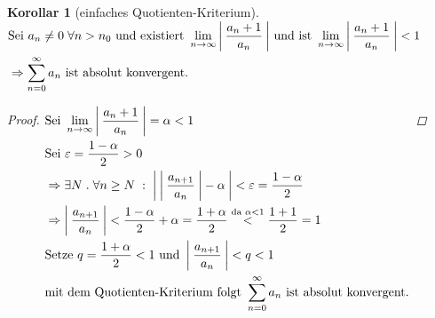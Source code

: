 \documentclass[a4paper,titlepage,oneside]{article}
\renewcommand{\epsilon}{\ensuremath{\varepsilon} }
\def\fa{\ensuremath{\forall}}
\def\sp{\hspace{0,1cm}}
\def\spdot{\sp.\sp}
\def\spcolon{\sp:\sp}
\newcommand{\suminf}[2][n]{\ensuremath{\sum_{#1= 0}^{\infty}{#2}}}
\renewcommand{\liminf}[2][n]{\ensuremath{\lim\limits_{#1 \rightarrow \infty}{#2}}}
\newcommand{\abs}[1]{\ensuremath{\left|\:#1\:\right|}}
\theoremstyle{thmstyle}
\newtheorem{korr}[satz]{Korollar}
\theoremstyle{subthmstyle}
\begin{document}
\begin{korr}[einfaches Quotienten-Kriterium]
\begin{math}\displaystyle \begin{aligned}[t]
&\text{Sei } a_n \ne 0 \sp \fa n > n_0 \text{ und existiert } \liminf{\abs{\frac{a_n+1}{a_n}}} \text{ und ist } \liminf{\abs{\frac{a_n+1}{a_n}}} < 1 \\
&\Rightarrow \suminf{a_n} \text{ ist absolut konvergent.}
\end{aligned}\end{math} 

\begin{proof}
\begin{math}\displaystyle \begin{aligned}[t]
&\text{Sei } \liminf{\abs{\frac{a_n+1}{a_n}}} = \alpha < 1 \\
&\text{Sei } \epsilon = \frac{1 - \alpha}{2} > 0 \\
&\Rightarrow \exists N \spdot \forall n \ge N \spcolon \abs{\abs{\frac{a_{n+1}}{a_n}} - \alpha} < \epsilon  = \frac{1-\alpha}{2} \\
&\Rightarrow \abs{\frac{a_{n+1}}{a_n}} < \frac{1-\alpha}{2} + \alpha = \frac{1+\alpha}{2} \overset{\text{da } \alpha < 1}{<} \frac{1+1}{2} = 1 \\
&\text{Setze } q = \frac{1 + \alpha}{2} < 1 \text{ und } \abs{\frac{a_{n+1}}{a_n}} < q < 1 \\
&\text{mit dem Quotienten-Kriterium folgt }\suminf{a_n} \text{ ist absolut konvergent.}
\end{aligned}\\\end{math} 
\end{proof}
\end{korr}
\end{document}
